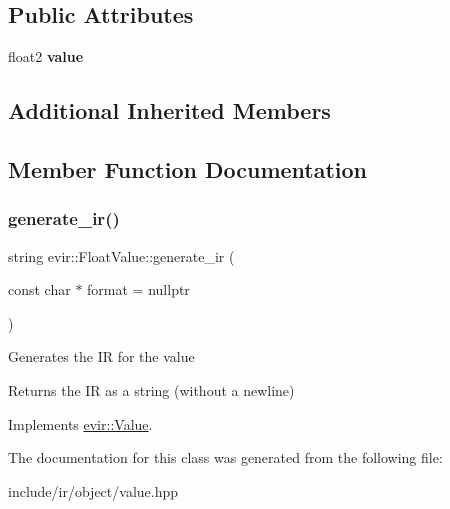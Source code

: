 \subsection*{Public Attributes}
\begin{DoxyCompactItemize}
\item 
\mbox{\label{classevir_1_1FloatValue_a15fa49462955f59082b7b1381c3867a7}} 
float2 {\bfseries value}
\end{DoxyCompactItemize}
\subsection*{Additional Inherited Members}


\subsection{Member Function Documentation}
\mbox{\label{classevir_1_1FloatValue_a775e25d41c34aca73ed9418963bb652b}} 
\subsubsection{\texorpdfstring{generate\+\_\+ir()}{generate\_ir()}}
{\footnotesize\ttfamily string evir\+::\+Float\+Value\+::generate\+\_\+ir (\begin{DoxyParamCaption}\item[{const char $\ast$}]{format = {\ttfamily nullptr} }\end{DoxyParamCaption})\hspace{0.3cm}{\ttfamily [virtual]}}

Generates the IR for the value \begin{DoxyReturn}{Returns}
the IR as a string (without a newline) 
\end{DoxyReturn}


Implements \hyperlink{classevir_1_1Value_a3e7e5bc634fd5bba528324076fe2a763}{evir\+::\+Value}.



The documentation for this class was generated from the following file\+:\begin{DoxyCompactItemize}
\item 
include/ir/object/value.\+hpp\end{DoxyCompactItemize}
